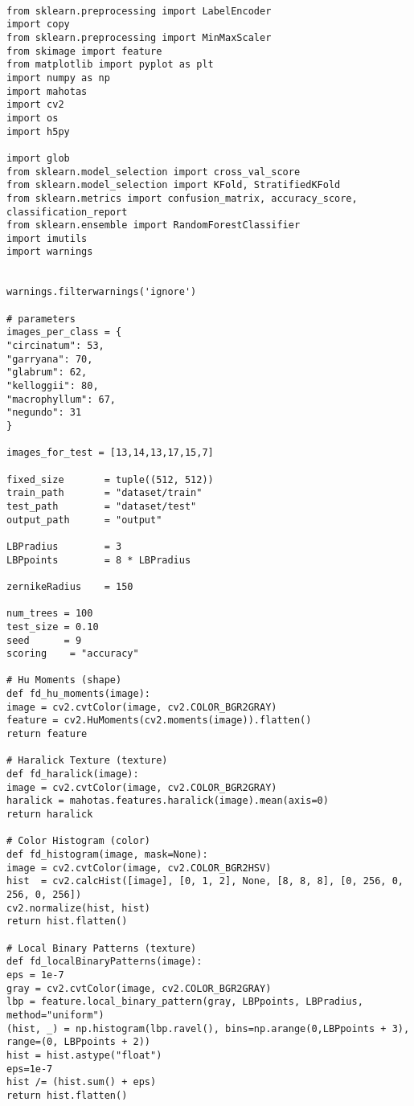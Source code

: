 \documentclass{article}
\begin{document}
\begin{verbatim}
	
from sklearn.preprocessing import LabelEncoder
import copy
from sklearn.preprocessing import MinMaxScaler
from skimage import feature
from matplotlib import pyplot as plt
import numpy as np
import mahotas
import cv2
import os
import h5py

import glob
from sklearn.model_selection import cross_val_score
from sklearn.model_selection import KFold, StratifiedKFold
from sklearn.metrics import confusion_matrix, accuracy_score, classification_report
from sklearn.ensemble import RandomForestClassifier
import imutils
import warnings


warnings.filterwarnings('ignore')

# parameters
images_per_class = {
"circinatum": 53,
"garryana": 70,
"glabrum": 62,
"kelloggii": 80,
"macrophyllum": 67,
"negundo": 31
}

images_for_test = [13,14,13,17,15,7]

fixed_size       = tuple((512, 512))
train_path       = "dataset/train"
test_path        = "dataset/test"
output_path      = "output"

LBPradius        = 3
LBPpoints        = 8 * LBPradius

zernikeRadius    = 150

num_trees = 100
test_size = 0.10
seed      = 9
scoring    = "accuracy"

# Hu Moments (shape)
def fd_hu_moments(image):
image = cv2.cvtColor(image, cv2.COLOR_BGR2GRAY)
feature = cv2.HuMoments(cv2.moments(image)).flatten()
return feature

# Haralick Texture (texture)
def fd_haralick(image):
image = cv2.cvtColor(image, cv2.COLOR_BGR2GRAY)
haralick = mahotas.features.haralick(image).mean(axis=0)
return haralick

# Color Histogram (color)
def fd_histogram(image, mask=None):
image = cv2.cvtColor(image, cv2.COLOR_BGR2HSV)
hist  = cv2.calcHist([image], [0, 1, 2], None, [8, 8, 8], [0, 256, 0, 256, 0, 256])
cv2.normalize(hist, hist)
return hist.flatten()

# Local Binary Patterns (texture)
def fd_localBinaryPatterns(image):
eps = 1e-7
gray = cv2.cvtColor(image, cv2.COLOR_BGR2GRAY)
lbp = feature.local_binary_pattern(gray, LBPpoints, LBPradius, method="uniform")
(hist, _) = np.histogram(lbp.ravel(), bins=np.arange(0,LBPpoints + 3), range=(0, LBPpoints + 2))
hist = hist.astype("float")
eps=1e-7
hist /= (hist.sum() + eps)
return hist.flatten()


\end{verbatim}
\end{document}
